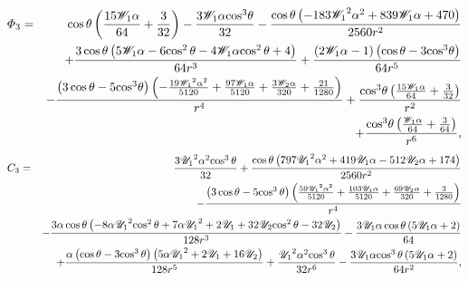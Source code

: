 \begin{eqnarray*}
\varPhi_3 &=& \cos\theta \left(\frac{15 \mathscr{W}_1\alpha}{64} + \frac{3}{32}\right) - \frac{3 \mathscr{W}_1\alpha {\cos}^3\theta}{32} - \frac{\cos\theta \left( - 183 {\mathscr{W}_1}^2\alpha^2 + 839 \mathscr{W}_1\alpha + 470\right)}{2560 r^2} \\ 
&&+ \frac{3 \cos\theta \left(5 \mathscr{W}_1\alpha - 6 {\cos^2\theta} - 4 \mathscr{W}_1\alpha {\cos^2\theta} + 4\right)}{64 r^3} + \frac{\left(2 \mathscr{W}_1\alpha - 1\right) \left(\cos\theta - 3 {\cos}^3\theta\right)}{64 r^5} 
\\ 
&&- \frac{\left(3 \cos\theta - 5 {\cos}^3\theta\right) \left( - \frac{19 {\mathscr{W}_1}^2\alpha^2}{5120} + \frac{97 \mathscr{W}_1\alpha}{5120} + \frac{3 \mathscr{W}_2\alpha}{320} + \frac{21}{1280}\right)}{r^4} + \frac{{\cos}^3\theta \left(\frac{15 \mathscr{W}_1\alpha}{64} + \frac{3}{32}\right)}{r^2} \\ 
&&+ \frac{{\cos}^3\theta \left(\frac{\mathscr{W}_1\alpha}{64} + \frac{3}{64}\right)}{r^6},
\end{eqnarray*}
\begin{eqnarray*}
C_3 &=&
\frac{3 {{\mathscr{U}_1}}^2\alpha^2 {\cos^3\theta}}{32} + \frac{\cos\theta \left(797 {{\mathscr{U}_1}}^2\alpha^2 + 419 {\mathscr{U}_1}\alpha - 512 {\mathscr{U}_2}\alpha + 174\right)}{2560 r^2} \\
&&- \frac{\left(3 \cos\theta - 5 {\cos^3\theta}\right) \left(\frac{59 {{\mathscr{U}_1}}^2\alpha^2}{5120} + \frac{103 {\mathscr{U}_1}\alpha}{5120} + \frac{69 {\mathscr{U}_2}\alpha}{320} + \frac{3}{1280}\right)}{r^4} \\
&&- \frac{3\alpha \cos\theta \left( - 8\alpha {{\mathscr{U}_1}}^2 {\cos^2\theta} + 7\alpha {{\mathscr{U}_1}}^2 + 2 {\mathscr{U}_1} + 32 {\mathscr{U}_2} {\cos^2\theta} - 32 {\mathscr{U}_2}\right)}{128 r^3} - \frac{3 {\mathscr{U}_1}\alpha \cos\theta \left(5 {\mathscr{U}_1}\alpha + 2\right)}{64} \\
&&+ \frac{\alpha \left(\cos\theta - 3 {\cos^3\theta}\right) \left(5\alpha {{\mathscr{U}_1}}^2 + 2 {\mathscr{U}_1} + 16 {\mathscr{U}_2}\right)}{128 r^5} + \frac{{{\mathscr{U}_1}}^2\alpha^2 {\cos^3\theta}}{32 r^6} - \frac{3 {\mathscr{U}_1}\alpha {\cos^3\theta} \left(5 {\mathscr{U}_1}\alpha + 2\right)}{64 r^2},
\end{eqnarray*}
